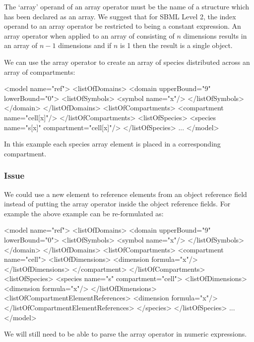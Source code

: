 \documentclass{cekarticle}
\begin{document}
The `array' operand of an array operator must be the name of a
structure which has been declared as an array.
We suggest that for SBML Level 2, the index operand to an array operator be
restricted to being a constant expression.  An array operator
when applied to an array of consisting of $n$ dimensions results
in an array of $n-1$ dimensions and if $n$ is 1 then the result
is a single object.

We can use the array operator to create an array of species
distributed across an array of compartments:
\begin{example}
<model name="ref">
    <listOfDomains>
        <domain upperBound="9" lowerBound="0">
            <listOfSymbols>
                <symbol name="x"/>
            </listOfSymbols>
        </domain>
    </listOfDomains>
    <listOfCompartments>
        <compartment name="cell[x]"/>
    </listOfCompartments>
    <listOfSpecies>
        <species name="s[x]" compartment="cell[x]"/>
    </listOfSpecies>
    ...
</model>
\end{example}
In this example each species array element is placed in a
corresponding compartment.

\subsubsection{Issue}
We could use a new element to reference elements from an object
reference field instead of putting the array operator inside the
object reference fields. For example the above example can be
re-formulated as:
\begin{example}
<model name="ref">
    <listOfDomains>
        <domain upperBound="9" lowerBound="0">
            <listOfSymbols>
                <symbol name="x"/>
            </listOfSymbols>
        </domain>
    </listOfDomains>
    <listOfCompartments>
        <compartment name="cell">
            <listOfDimensions>
                <dimension formula="x"/>
            </listOfDimensions>
        </compartment>
    </listOfCompartments>
    <listOfSpecies>
        <species name="s" compartment="cell">
            <listOfDimensions>
                <dimension formula="x"/>
            </listOfDimensions>
            <listOfCompartmentElementReferences>
                <dimension formula="x"/>
            </listOfCompartmentElementReferences>
        </species>
    </listOfSpecies>
    ...
</model>

\end{example}
We will still need to be able to parse the array operator in
numeric expressions.
\end{document}
